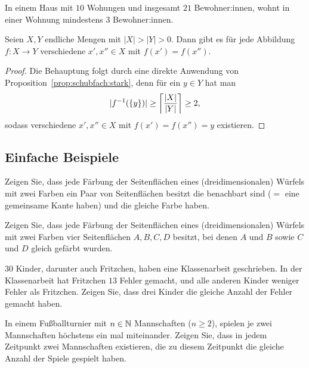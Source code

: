 \begin{bsp}
	In einem Haus mit $10$ Wohungen und insgesamt $21$ Bewohner:innen, wohnt in einer Wohnung mindestens $3$ Bewohner:innen. 
\end{bsp} 

\begin{kor} 
	Seien $X, Y$ endliche Mengen mit $|X| > |Y| >0$. Dann gibt es für jede Abbildung $f : X \to Y$ verschiedene $x',x''\in X$ mit $f(x')=f(x'')$. 
\end{kor} 
\begin{proof}
	Die Behauptung folgt durch eine direkte Anwendung von Proposition~\ref{prop:schubfach:stark}, denn für ein $y \in Y$ hat man 
	\[
		| f^{-1}(\{y\}) | \ge \left\lceil \frac{|X|}{|Y|} \right\rceil \ge 2,
	\]
	sodass verschiedene $x',x'' \in X$ mit $f(x') = f(x'') =y$ existieren. 
\end{proof} 

\subsection{Einfache Beispiele} 

\begin{aufg}
	Zeigen Sie, dass jede Färbung der Seitenflächen eines (dreidimensionalen) Würfels mit zwei Farben ein Paar von Seitenflächen besitzt	die benachbart sind ($=$ eine gemeinsame Kante haben) und die gleiche Farbe haben. 
\end{aufg}

\begin{aufg}
	Zeigen Sie, dass jede Färbung der Seitenflächen eines (dreidimensionalen) Würfels mit zwei Farben vier Seitenflächen $A,B,C,D$ besitzt, bei denen $A$ und $B$ sowie $C$ und $D$ gleich gefärbt wurden. 
\end{aufg} 

\begin{aufg}
	$30$ Kinder, darunter auch Fritzchen, haben eine Klassenarbeit geschrieben. In der Klassenarbeit hat Fritzchen $13$ Fehler gemacht, und alle anderen Kinder weniger Fehler als Fritzchen. Zeigen Sie, dass drei Kinder die gleiche Anzahl der Fehler gemacht haben. 
\end{aufg}  

\begin{aufg}
	In einem Fußballturnier mit $n \in \mathbb{N}$ Mannschaften ($n \ge 2$), spielen je zwei Mannschaften höchstens ein mal miteinander. Zeigen Sie, dass in jedem Zeitpunkt zwei Mannschaften existieren, die zu diesem Zeitpunkt die gleiche Anzahl der Spiele gespielt haben. 
\end{aufg} 

